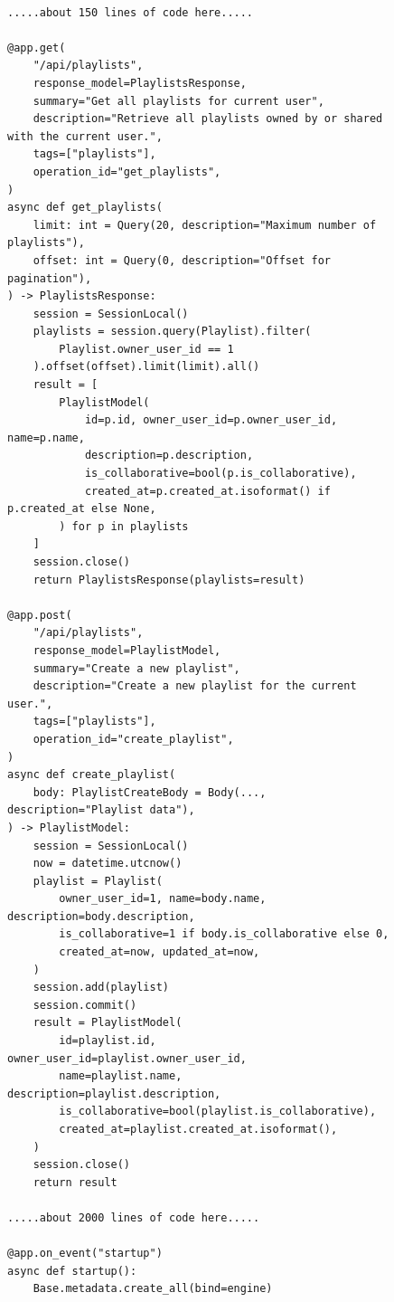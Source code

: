 \begin{figure}[t]
\centering
\begin{minipage}{0.97\textwidth}
\begin{lstlisting}[style=pythonstyle, firstnumber=200]

.....about 150 lines of code here.....

@app.get(
    "/api/playlists",
    response_model=PlaylistsResponse,
    summary="Get all playlists for current user",
    description="Retrieve all playlists owned by or shared with the current user.",
    tags=["playlists"],
    operation_id="get_playlists",
)
async def get_playlists(
    limit: int = Query(20, description="Maximum number of playlists"),
    offset: int = Query(0, description="Offset for pagination"),
) -> PlaylistsResponse:
    session = SessionLocal()
    playlists = session.query(Playlist).filter(
        Playlist.owner_user_id == 1
    ).offset(offset).limit(limit).all()
    result = [
        PlaylistModel(
            id=p.id, owner_user_id=p.owner_user_id, name=p.name,
            description=p.description,
            is_collaborative=bool(p.is_collaborative),
            created_at=p.created_at.isoformat() if p.created_at else None,
        ) for p in playlists
    ]
    session.close()
    return PlaylistsResponse(playlists=result)

@app.post(
    "/api/playlists",
    response_model=PlaylistModel,
    summary="Create a new playlist",
    description="Create a new playlist for the current user.",
    tags=["playlists"],
    operation_id="create_playlist",
)
async def create_playlist(
    body: PlaylistCreateBody = Body(..., description="Playlist data"),
) -> PlaylistModel:
    session = SessionLocal()
    now = datetime.utcnow()
    playlist = Playlist(
        owner_user_id=1, name=body.name, description=body.description,
        is_collaborative=1 if body.is_collaborative else 0,
        created_at=now, updated_at=now,
    )
    session.add(playlist)
    session.commit()
    result = PlaylistModel(
        id=playlist.id, owner_user_id=playlist.owner_user_id,
        name=playlist.name, description=playlist.description,
        is_collaborative=bool(playlist.is_collaborative),
        created_at=playlist.created_at.isoformat(),
    )
    session.close()
    return result

.....about 2000 lines of code here.....

@app.on_event("startup")
async def startup():
    Base.metadata.create_all(bind=engine)


\end{lstlisting}
\end{minipage}
\end{figure}
